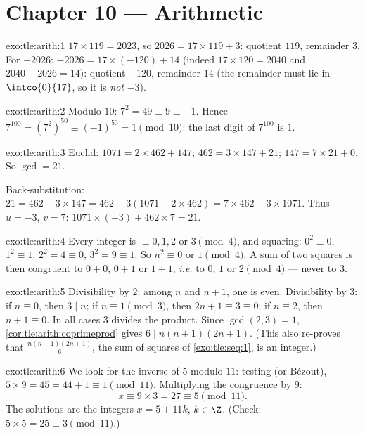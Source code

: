 \section*{Chapter 10 --- Arithmetic}

\begin{solution}{exo:tle:arith:1}
$17 \times 119 = 2023$, so $2026 = 17 \times 119 + 3$: quotient $119$,
remainder $3$. For $-2026$: $-2026 = 17\times(-120) + 14$ (indeed
$17 \times 120 = 2040$ and $2040 - 2026 = 14$): quotient $-120$, remainder
$14$ (the remainder must lie in $\intco{0}{17}$, so it is \emph{not} $-3$).
\end{solution}

\begin{solution}{exo:tle:arith:2}
Modulo $10$: $7^2 = 49 \equiv 9 \equiv -1$. Hence
$7^{100} = \left(7^2\right)^{50} \equiv (-1)^{50} = 1 \pmod{10}$: the last
digit of $7^{100}$ is $1$.
\end{solution}

\begin{solution}{exo:tle:arith:3}
Euclid: $1071 = 2\times462 + 147$; $462 = 3\times147 + 21$;
$147 = 7\times21 + 0$. So $\gcd = 21$.

Back-substitution: $21 = 462 - 3\times147 = 462 - 3(1071 - 2\times462)
= 7\times462 - 3\times1071$. Thus $u = -3$, $v = 7$:
$1071\times(-3) + 462\times7 = 21$.
\end{solution}

\begin{solution}{exo:tle:arith:4}
Every integer is $\equiv 0, 1, 2$ or $3 \pmod 4$, and squaring:
$0^2 \equiv 0$, $1^2 \equiv 1$, $2^2 = 4 \equiv 0$, $3^2 = 9 \equiv 1$. So
$n^2 \equiv 0$ or $1 \pmod 4$. A sum of two squares is then congruent to
$0 + 0$, $0 + 1$ or $1 + 1$, \emph{i.e.} to $0$, $1$ or $2 \pmod 4$ ---
never to $3$.
\end{solution}

\begin{solution}{exo:tle:arith:5}
Divisibility by $2$: among $n$ and $n + 1$, one is even. Divisibility by
$3$: if $n \equiv 0$, then $3 \mid n$; if $n \equiv 1 \pmod 3$, then
$2n + 1 \equiv 3 \equiv 0$; if $n \equiv 2$, then $n + 1 \equiv 0$. In all
cases $3$ divides the product. Since $\gcd(2,3) = 1$,
\cref{cor:tle:arith:coprimeprod} gives $6 \mid n(n+1)(2n+1)$.
(This also re-proves that $\frac{n(n+1)(2n+1)}{6}$, the sum of squares of
\cref{exo:tle:seq:1}, is an integer.)
\end{solution}

\begin{solution}{exo:tle:arith:6}
We look for the inverse of $5$ modulo $11$: testing (or Bézout),
$5 \times 9 = 45 = 44 + 1 \equiv 1 \pmod{11}$. Multiplying the congruence by
$9$:
\[
x \equiv 9 \times 3 = 27 \equiv 5 \pmod{11}.
\]
The solutions are the integers $x = 5 + 11k$, $k \in \Z$. (Check:
$5\times5 = 25 \equiv 3 \pmod{11}$.)
\end{solution}

